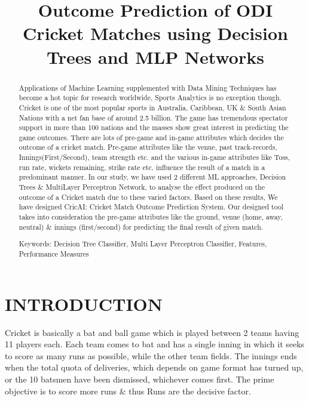 \documentclass[a4paper, 10pt, conference]{IEEEtran}
\title{Outcome Prediction of ODI Cricket Matches using Decision Trees and MLP Networks}
\author{
\IEEEauthorblockN{\IEEEauthorrefmark{1}Rajeev Kumar,\IEEEauthorrefmark{2}Jalaz Kumar}
\IEEEauthorblockA{
\IEEEauthorrefmark{1}Assistant Professor,\IEEEauthorrefmark{2}Student\\
Department of Computer Science and Engineering\\
National Institute of Technology Hamirpur, India\\
\IEEEauthorrefmark{1}rajeev@nith.ac.in,\IEEEauthorrefmark{2}jalazkumar1208@gmail.com}}
\begin{document}
\maketitle
\thispagestyle{empty}
\pagestyle{empty}


\begin{abstract}

Applications of Machine Learning supplemented with Data Mining Techniques has become a hot topic for research worldwide, Sports Analytics is no exception though. Cricket is one of the most popular sports in Australia, Caribbean, UK \& South Asian Nations with a net fan base of around 2.5 billion. The game has tremendous spectator support in more than 100 nations and the masses show great interest in predicting the game outcomes. There are lots of pre-game and in-game attributes which decides the outcome of a cricket match. Pre-game attributes like the venue, past track-records, Innings(First/Second), team strength etc. and the various in-game attributes like Toss, run rate, wickets remaining, strike rate etc. influence the result of a match in a predominant manner. In our study, we have used 2 different ML approaches, Decision Trees \& MultiLayer Perceptron Network, to analyse the effect produced on the outcome of a Cricket match due to these varied factors. Based on these results, We have designed CricAI: Cricket Match Outcome Prediction System. Our designed tool takes into consideration the pre-game attributes like the ground, venue (home, away, neutral) \& innings (first/second) for predicting the final result of given match.


Keywords: Decision Tree Classifier, Multi Layer Perceptron Classifier, Features, Performance Measures

\end{abstract}


\section{INTRODUCTION}

Cricket is basically a bat and ball game which is played between 2 teams having 11 players each. Each team comes to bat and has a single inning in which it seeks to score as many runs as possible, while the other team fields. The innings ends when the total quota of deliveries, which depends on game format has turned up, or the 10 batsmen have been dismissed, whichever comes first. The prime objective is to score more runs \& thus Runs are the decisive factor.
\end{document}
